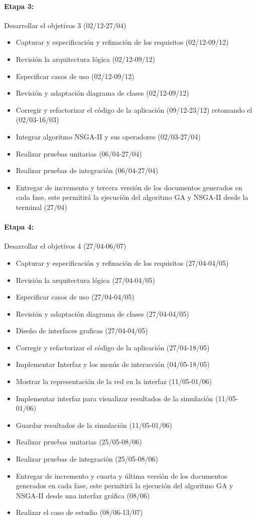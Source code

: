 \documentclass[11pt,letterpaper]{article}
\begin{document}
\paragraph{Etapa 3:} Desarrollar el objetivos 3 (02/12-27/04)
\begin{itemize}
	\item Capturar y especificación y refinación de los requisitos (02/12-09/12)
	\item Revisión la arquitectura lógica (02/12-09/12)
	\item Especificar casos de uso (02/12-09/12)
	\item Revisión y adaptación diagrama de clases (02/12-09/12)
	\item Corregir y refactorizar el código de la aplicación (09/12-23/12) retomando el (02/03-16/03)
	\item Integrar algoritmo NSGA-II y sus operadores (02/03-27/04)
	\item Realizar pruebas unitarias (06/04-27/04)
	\item Realizar pruebas de integración (06/04-27/04)
	\item Entregar de incremento y tercera versión de los documentos generados en cada fase, este permitirá la ejecución del algoritmo GA y NSGA-II desde la terminal (27/04)
\end{itemize}

\paragraph{Etapa 4:} Desarrollar el objetivos 4 (27/04-06/07)
\begin{itemize}
	\item Capturar y especificación y refinación de los requisitos (27/04-04/05)
	\item Revisión la arquitectura lógica (27/04-04/05)
	\item Especificar casos de uso (27/04-04/05)
	\item Revisión y adaptación diagrama de clases (27/04-04/05)
	\item Diseño de interfaces graficas (27/04-04/05)
	\item Corregir y refactorizar el código de la aplicación (27/04-18/05)
	\item Implementar Interfaz y los menús de interacción (04/05-18/05)
	\item Mostrar la representación de la red en la interfaz (11/05-01/06)
	\item Implementar interfaz para visualizar resultados de la simulación (11/05-01/06)
	\item Guardar resultados de la simulación (11/05-01/06)
	\item Realizar pruebas unitarias (25/05-08/06)
	\item Realizar pruebas de integración (25/05-08/06)
	\item Entregar de incremento y cuarta y última versión de los documentos generados en cada fase, este permitirá la ejecución del algoritmo GA y NSGA-II desde una interfaz gráfica (08/06)
	\item Realizar el caso de estudio (08/06-13/07)
\end{itemize}





\end{document}
